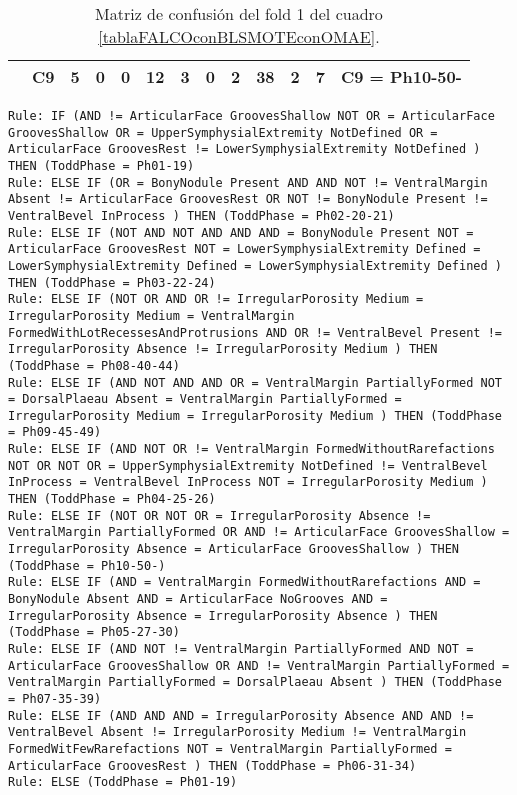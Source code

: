 \begin{table}[H]
{\begin{tabular}{|ccrrrrrrrrrrc|}
\multicolumn{1}{|c|}{}                                      & \multicolumn{1}{c|}{C9} & \multicolumn{1}{c|}{\textbf{5}}  & \multicolumn{1}{c|}{0}  & \multicolumn{1}{c|}{0}  & \multicolumn{1}{c|}{\textbf{12}} & \multicolumn{1}{c|}{\textbf{3}}  & \multicolumn{1}{c|}{0}  & \multicolumn{1}{c|}{\textbf{2}}  & \multicolumn{1}{c|}{\textbf{38}} & \multicolumn{1}{c|}{\textbf{2}}  & \multicolumn{1}{c|}{\textbf{7}}  & C9 = Ph10-50-     \\ \hline
\end{tabular}%
}
\caption{Matriz de confusión del fold 1 del cuadro \ref{tablaFALCOconBLSMOTEconOMAE}.}

\end{table}

\begin{lstlisting}
Rule: IF (AND != ArticularFace GroovesShallow NOT OR = ArticularFace GroovesShallow OR = UpperSymphysialExtremity NotDefined OR = ArticularFace GroovesRest != LowerSymphysialExtremity NotDefined ) THEN (ToddPhase = Ph01-19)
Rule: ELSE IF (OR = BonyNodule Present AND AND NOT != VentralMargin Absent != ArticularFace GroovesRest OR NOT != BonyNodule Present != VentralBevel InProcess ) THEN (ToddPhase = Ph02-20-21)
Rule: ELSE IF (NOT AND NOT AND AND AND = BonyNodule Present NOT = ArticularFace GroovesRest NOT = LowerSymphysialExtremity Defined = LowerSymphysialExtremity Defined = LowerSymphysialExtremity Defined ) THEN (ToddPhase = Ph03-22-24)
Rule: ELSE IF (NOT OR AND OR != IrregularPorosity Medium = IrregularPorosity Medium = VentralMargin FormedWithLotRecessesAndProtrusions AND OR != VentralBevel Present != IrregularPorosity Absence != IrregularPorosity Medium ) THEN (ToddPhase = Ph08-40-44)
Rule: ELSE IF (AND NOT AND AND OR = VentralMargin PartiallyFormed NOT = DorsalPlaeau Absent = VentralMargin PartiallyFormed = IrregularPorosity Medium = IrregularPorosity Medium ) THEN (ToddPhase = Ph09-45-49)
Rule: ELSE IF (AND NOT OR != VentralMargin FormedWithoutRarefactions NOT OR NOT OR = UpperSymphysialExtremity NotDefined != VentralBevel InProcess = VentralBevel InProcess NOT = IrregularPorosity Medium ) THEN (ToddPhase = Ph04-25-26)
Rule: ELSE IF (NOT OR NOT OR = IrregularPorosity Absence != VentralMargin PartiallyFormed OR AND != ArticularFace GroovesShallow = IrregularPorosity Absence = ArticularFace GroovesShallow ) THEN (ToddPhase = Ph10-50-)
Rule: ELSE IF (AND = VentralMargin FormedWithoutRarefactions AND = BonyNodule Absent AND = ArticularFace NoGrooves AND = IrregularPorosity Absence = IrregularPorosity Absence ) THEN (ToddPhase = Ph05-27-30)
Rule: ELSE IF (AND NOT != VentralMargin PartiallyFormed AND NOT = ArticularFace GroovesShallow OR AND != VentralMargin PartiallyFormed = VentralMargin PartiallyFormed = DorsalPlaeau Absent ) THEN (ToddPhase = Ph07-35-39)
Rule: ELSE IF (AND AND AND = IrregularPorosity Absence AND AND != VentralBevel Absent != IrregularPorosity Medium != VentralMargin FormedWitFewRarefactions NOT = VentralMargin PartiallyFormed = ArticularFace GroovesRest ) THEN (ToddPhase = Ph06-31-34)
Rule: ELSE (ToddPhase = Ph01-19)
\end{lstlisting}



